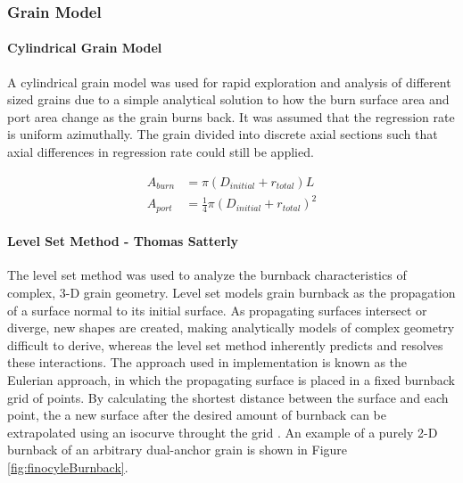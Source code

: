 \subsubsection{Grain Model}

\paragraph{Cylindrical Grain Model}

A cylindrical grain model was used for rapid exploration and analysis of different sized grains due to a simple analytical solution to how the burn surface area and port area change as the grain burns back. It was assumed that the regression rate is uniform azimuthally. The grain divided into discrete axial sections such that axial differences in regression rate could still be applied.

\begin{align}
    A_{burn} &= \pi (D_{initial} + r_{total})L\\
    A_{port} &= \frac{1}{4}\pi (D_{initial} + r_{total})^2
\end{align}

\paragraph{Level Set Method - Thomas Satterly}

The level set method was used to analyze the burnback characteristics of complex, 3-D grain geometry. Level set models grain burnback as the propagation of a surface normal to its initial surface. As propagating surfaces intersect or diverge, new shapes are created, making analytically models of complex geometry difficult to derive, whereas the level set method inherently predicts and resolves these interactions. The approach used in implementation is known as the Eulerian approach, in which the propagating surface is placed in a fixed burnback grid of points. By calculating the shortest distance between the surface and each point, the a new surface after the desired amount of burnback can be extrapolated using an isocurve throught the grid \cite{tshokotsha_2016}. An example of a purely 2-D burnback of an arbitrary dual-anchor grain is shown in Figure \ref{fig:finocyleBurnback}.

